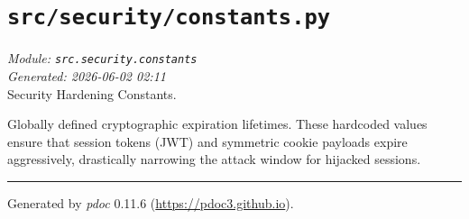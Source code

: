 
\section{\texttt{src/security/constants.py}}
\textit{Module: \texttt{src.security.constants}} \\
\textit{Generated: 2026-06-02 02:11} \\

Security Hardening Constants.

Globally defined cryptographic expiration lifetimes. These hardcoded
values ensure that session tokens (JWT) and symmetric cookie payloads
expire aggressively, drastically narrowing the attack window for
hijacked sessions.

\begin{center}\rule{0.5\linewidth}{0.5pt}
\end{center}

Generated by \emph{pdoc} 0.11.6 (\url{https://pdoc3.github.io}).
